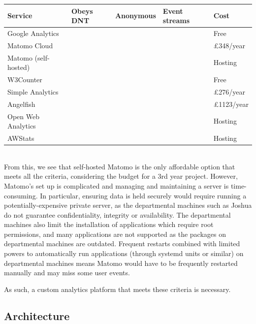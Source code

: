\documentclass[a4paper,fleqn,oneside,12pt]{report}
\newcommand{\cmark}{\ding{51}}
\newcommand{\xmark}{\ding{55}}
\begin{document}
\begin{adjustbox}{center}\begin{tabular}{ |l|l|l|l|l| }
  \hline
  \textbf{Service} & \textbf{Obeys DNT} & \textbf{Anonymous} & \textbf{Event streams} & \textbf{Cost} \\
  \hline
  Google Analytics & \xmark & \xmark & \xmark & Free \\
  \hline
  Matomo Cloud & \cmark & \cmark & \cmark & £348/year \\
  \hline
  Matomo (self-hosted) & \cmark & \cmark & \cmark & Hosting \\
  \hline
  W3Counter & \xmark & \xmark & \cmark & Free \\
  \hline
  Simple Analytics & \cmark & \cmark & \cmark & £276/year \\
  \hline
  Angelfish & \xmark & \xmark & \cmark & £1123/year \\
  \hline
  Open Web Analytics & \xmark & \xmark & \cmark & Hosting \\
  \hline
  AWStats & \xmark & \xmark & \xmark & Hosting \\
  \hline
\end{tabular}\end{adjustbox}\\

From this, we see that self-hosted Matomo is the only affordable option that meets all the criteria, considering the budget for a 3rd year project. However, Matomo's set up is complicated and managing and maintaining a server is time-consuming. In particular, ensuring data is held securely would require running a potentially-expensive private server, as the departmental machines such as Joshua do not guarantee confidentiality, integrity or availability. The departmental machines also limit the installation of applications which require root permissions, and many applications are not supported as the packages on departmental machines are outdated. Frequent restarts combined with limited powers to automatically run applications (through systemd units or similar) on departmental machines means Matomo would have to be frequently restarted manually and may miss some user events.

As such, a custom analytics platform that meets these criteria is necessary.

\subsection{Architecture}
\end{document}
